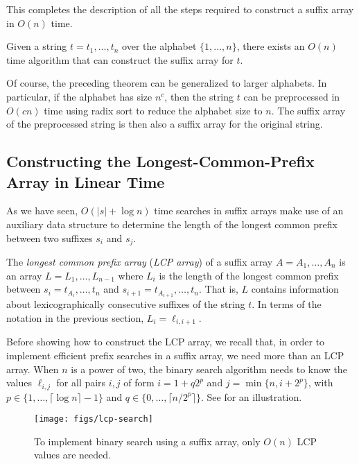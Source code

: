 This completes the description of all the steps required to construct a suffix array in $O(n)$ time.

\begin{thm}
  Given a string $t=t_1,\ldots,t_n$ over the alphabet $\{1,\ldots,n\}$,
  there exists an $O(n)$ time algorithm that can construct the suffix
  array for $t$.
\end{thm}

Of course, the preceding theorem can be generalized to larger
alphabets. In particular, if the alphabet has size $n^c$, then the string
$t$ can be preprocessed in $O(cn)$ time using radix sort to reduce the
alphabet size to $n$.  The suffix array of the preprocessed string is then also a suffix array for the original string.

\subsection{Constructing the Longest-Common-Prefix Array in Linear Time}

As we have seen, $O(|s|+\log n)$ time searches in suffix arrays make use
of an auxiliary data structure to determine the length of the longest
common prefix between two suffixes $s_i$ and $s_j$.

The \emph{longest common prefix array} (\emph{LCP array}) of a suffix
array $A=A_1,\ldots,A_n$ is an array $L=L_1,\ldots,L_{n-1}$ where $L_i$ is
the length of the longest common prefix between $s_i=t_{A_i},\ldots,t_n$
and $s_{i+1}=t_{A_{i+1}},\ldots,t_n$.  That is, $L$ contains information
about lexicographically consecutive suffixes of the string $t$.  In terms
of the notation in the previous section, $L_i=\ell_{i,i+1}$.

Before showing how to construct the LCP array, we recall that, in order
to implement efficient prefix searches in a suffix array, we need more
than an LCP array.  When $n$ is a power of two, the binary search
algorithm needs to know the values $\ell_{i,j}$ for all pairs $i,j$
of form $i=1+q2^p$ and $j=\min\{n,i+2^{p}\}$, with $p\in\{1,\ldots,\lceil \log
n\rceil-1\}$ and $q\in\{0,\ldots,\lceil n/2^p\rceil\}$.  See  for an illustration. 

\begin{figure}
  \begin{center}
    \texttt{[image: figs/lcp-search]}
  \end{center}
  \caption{To implement binary search using a suffix array, only $O(n)$ LCP values are needed.}
\end{figure}

